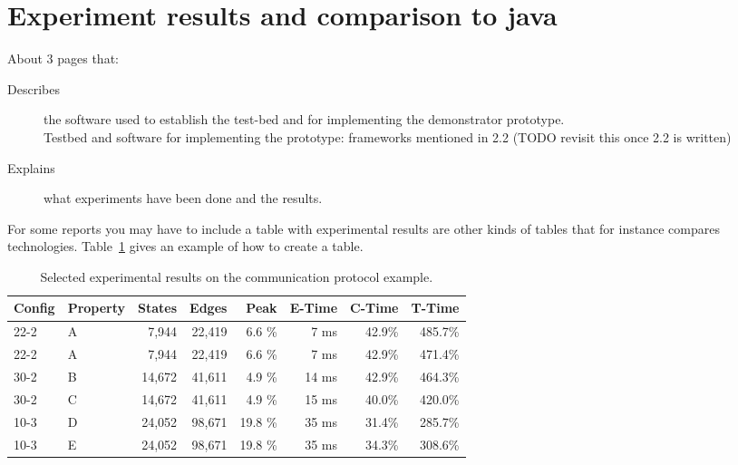 \section{Experiment results and comparison to java}
\label{sec:experiments}

About 3 pages that:

\begin{description}

\item[Describes] the software used to establish the test-bed and for implementing the demonstrator prototype.
\\
Testbed and software for implementing the prototype: frameworks mentioned in 2.2 (TODO revisit this once 2.2 is written)


\item[Explains] what experiments have been done and the results.

\end{description}

For some reports you may have to include a table with experimental
results are other kinds of tables that for instance compares
technologies. Table~\ref{tab:results} gives an example of how to create a table.

\begin{table}
\centering
\begin{tabular}{llrrrrrr}
  Config & Property & States & Edges & Peak & E-Time & C-Time & T-Time
  \\ \hline \hline
22-2 & A   &    7,944  &   22,419  &  6.6  \%  &  7 ms & 42.9\% &  485.7\% \\   
22-2 & A   &    7,944  &   22,419  &  6.6  \%  &  7 ms & 42.9\% &  471.4\% \\   
30-2 & B   &   14,672  &   41,611  &  4.9  \%  & 14 ms & 42.9\% &  464.3\% \\   
30-2 & C   &   14,672  &   41,611  &  4.9  \%  & 15 ms & 40.0\% &  420.0\% \\ \hline
10-3 & D   &   24,052  &   98,671  & 19.8  \%  & 35 ms & 31.4\% &  285.7\% \\   
10-3 & E   &   24,052  &   98,671  & 19.8  \%  & 35 ms & 34.3\% &  308.6\% \\
\hline \hline
\end{tabular}
\caption{Selected experimental results on the communication protocol example.}
\label{tab:results}
\end{table}


